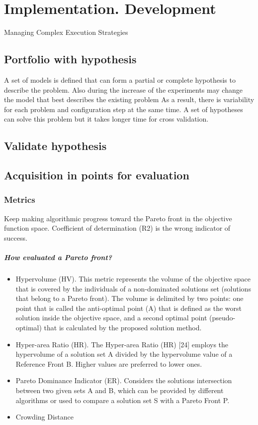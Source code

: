 \chapter{Implementation. Development}
Managing Complex Execution Strategies

\section{Portfolio with hypothesis}
A set of models is defined that can form a partial or complete hypothesis to describe the problem.
Also during the increase of the experiments may change the model that best describes the existing problem
As a result, there is variability for each problem and configuration step at the same time. 
A set of hypotheses can solve this problem but it takes longer time for cross validation.

\section{Validate hypothesis}
\section{Acquisition in points for evaluation}

    \subsection{Metrics}
    Keep making algorithmic progress toward the Pareto front in the objective function space.
    Coefficient of determination (R2) is the wrong indicator of success.

    \paragraph{How evaluated a Pareto front?}
    \begin{itemize}
        \item Hypervolume (HV). 
        This metric represents the volume of the objective space
        that is covered by the individuals of a non-dominated
        solutions set (solutions that belong to a Pareto front). The
        volume is delimited by two points: one point that is called
        the anti-optimal point (A) that is defined as the worst
        solution inside the objective space, and a second optimal
        point (pseudo-optimal) that is calculated by the proposed
        solution method. 
        \item Hyper-area Ratio (HR).
        The Hyper-area Ratio (HR) [24] employs the hypervolume of a solution set A
        divided by the hypervolume value of a Reference Front B. Higher values are
        preferred to lower ones.
        \item Pareto Dominance Indicator (ER). 
        Considers the solutions intersection between two given sets A and B, which can be 
        provided by different algorithms or used to compare a solution set S with a Pareto Front P.
        \item Crowding Distance
        
    \end{itemize}


